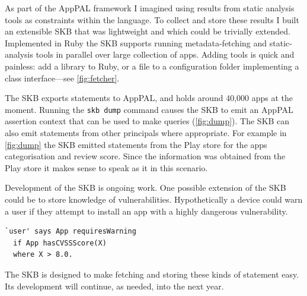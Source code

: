 \documentclass[a4paper]{scrartcl}
\begin{document}
As part of the AppPAL framework I imagined using results from static analysis tools as constraints within the language.
To collect and store these results I built an extensible \ac{SKB} that was lightweight and which could be trivially extended.
Implemented in Ruby the \ac{SKB} supports running metadata-fetching and static-analysis tools in parallel over large collection of apps.
Adding tools is quick and painless: add a library to Ruby, or a file to a configuration folder implementing a class interface---see \autoref{fig:fetcher}.

The \ac{SKB} exports statements to AppPAL, and holds around 40,000 apps at the moment.
Running the \texttt{skb dump} command causes the SKB to emit an AppPAL assertion context that can be used to make queries (\autoref{fig:dump}).
The \ac{SKB} can also emit statements from other principals where appropriate.
For example in \autoref{fig:dump} the \ac{SKB} emitted  statements from the Play store for the apps categorisation and review score.
Since the information was obtained from the Play store it makes sense to speak as it in this scenario.

Development of the \ac{SKB} is ongoing work.
One possible extension of the \ac{SKB} could be to store knowledge of vulnerabilities.
Hypothetically a device could warn a user if they attempt to install an app with a highly dangerous vulnerability.
\begin{lstlisting}
`user' says App requiresWarning
  if App hasCVSSScore(X)
  where X > 8.0.
\end{lstlisting}
The \ac{SKB} is designed to make fetching and storing these kinds of statement easy.
Its development will continue, as needed, into the next year.
\end{document}
